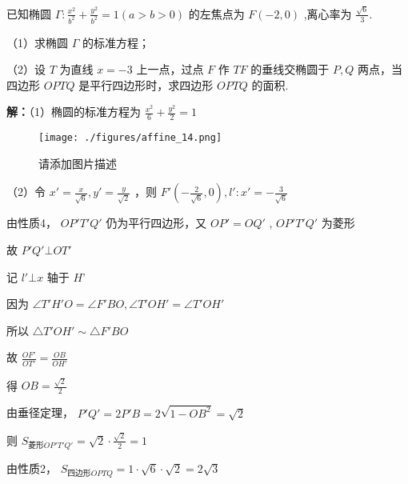 \begin{example}{}
已知椭圆 $\displaystyle{\Gamma:\frac{x^2}{b^2}+\frac{y^2}{b^2}=1(a>b>0)}$ 的左焦点为 $\displaystyle{F(-2,0)}$ ,离心率为 $\displaystyle{\frac{\sqrt{6}}{3}}$.

（1）求椭圆 $\displaystyle{\Gamma}$ 的标准方程；

（2）设 $\displaystyle{T}$ 为直线 $\displaystyle{x=-3}$ 上一点，过点 $\displaystyle{F}$ 作 $\displaystyle{TF}$ 的垂线交椭圆于 $\displaystyle{P,Q}$ 两点，当四边形 $\displaystyle{OPTQ}$ 是平行四边形时，求四边形 $\displaystyle{OPTQ}$ 的面积.

\textbf{解：}（1）椭圆的标准方程为 $\displaystyle{\frac{x^2}{6}+\frac{y^2}{2}=1}$
\begin{figure}[ht]
\centering
\texttt{[image: ./figures/affine\_14.png]}
\caption{请添加图片描述} \label{affine_fig14}
\end{figure}
（2）令 $\displaystyle{x'=\frac{x}{\sqrt{6}},y'=\frac{y}{\sqrt{2}}}$ ，则 $\displaystyle{F'\left(-\frac{2}{\sqrt{6}},0\right) , l':x'=-\frac{3}{\sqrt{6}}}$

由性质4， $\displaystyle{OP'T'Q'}$ 仍为平行四边形，又 $\displaystyle{OP'=OQ'}$ , $\displaystyle{OP'T'Q'}$ 为菱形

故 $\displaystyle{P'Q'\bot OT'}$

记  $\displaystyle{l'\bot x}$ 轴于 $\displaystyle{H’}$ 

因为 $\displaystyle{\angle T'H'O=\angle F'BO,\angle T'OH'=\angle T'OH'}$

所以 $\displaystyle{\triangle T'OH'\sim\triangle F'BO}$

故 $\displaystyle{\frac{OF'}{OT'}=\frac{OB}{OH'}}$

得 $\displaystyle{OB=\frac{\sqrt{2}}{2}}$

由垂径定理， $\displaystyle{P'Q'=2P'B=2\sqrt{1-OB^2}=\sqrt{2}}$

则 $\displaystyle{S_{菱形OP'T'Q'}=\sqrt{2}\cdot\frac{\sqrt{2}}{2}=1}$

由性质2， $\displaystyle{S_{四边形OPTQ}=1\cdot \sqrt{6}\cdot\sqrt{2}=2\sqrt{3}}$ 
\end{example}

